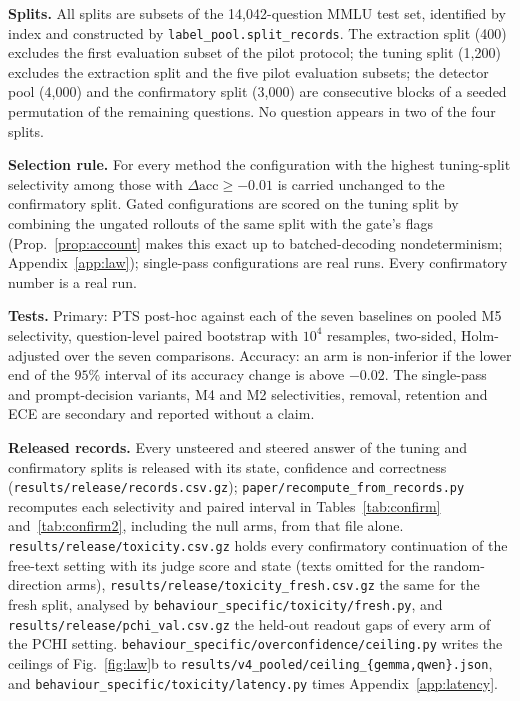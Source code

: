 \documentclass{article}
\begin{document}
\textbf{Splits.} All splits are subsets of the 14{,}042-question MMLU test set,
identified by index and constructed by \texttt{label\_pool.split\_records}. The
extraction split (400) excludes the first evaluation subset of the pilot
protocol; the tuning split (1{,}200) excludes the
extraction split and the five pilot evaluation subsets; the detector pool (4{,}000) and the confirmatory
split (3{,}000) are consecutive blocks of a seeded permutation of the
remaining questions. No question appears in two of the four splits.

\textbf{Selection rule.} For every method the configuration with the highest
tuning-split selectivity among those with $\Delta\mathrm{acc}\ge-0.01$ is
carried unchanged to the confirmatory split. Gated configurations are scored on
the tuning split by combining the ungated rollouts of the same split with the
gate's flags (Prop.~\ref{prop:account} makes this exact up to batched-decoding
nondeterminism; Appendix~\ref{app:law}); single-pass configurations are real
runs. Every confirmatory number is a real run.

\textbf{Tests.} Primary: PTS post-hoc against each of the seven baselines on
pooled M5 selectivity, question-level paired bootstrap with $10^4$ resamples,
two-sided, Holm-adjusted over the seven comparisons. Accuracy: an arm is
non-inferior if the lower end of the $95\%$ interval of its accuracy change is
above $-0.02$. The single-pass and prompt-decision variants, M4 and M2
selectivities, removal, retention and ECE are secondary and reported without
a claim.

\textbf{Released records.} Every unsteered and steered answer of the tuning and
confirmatory splits is released with its state, confidence and correctness
(\texttt{results/release/records.csv.gz}); \texttt{paper/recompute\_from\_records.py}
recomputes each selectivity and paired interval in Tables~\ref{tab:confirm}
and~\ref{tab:confirm2}, including the null arms, from that file alone.
\texttt{results/release/toxicity.csv.gz} holds every confirmatory continuation
of the free-text setting with its judge score and state (texts omitted for the
random-direction arms), \texttt{results/release/toxicity\_fresh.csv.gz} the
same for the fresh split, analysed by \texttt{behaviour\_specific/toxicity/fresh.py},
and \texttt{results/release/pchi\_val.csv.gz} the held-out readout gaps of every
arm of the PCHI setting. \texttt{behaviour\_specific/overconfidence/ceiling.py}
writes the ceilings of Fig.~\ref{fig:law}b to
\texttt{results/v4\_pooled/ceiling\_\{gemma,qwen\}.json}, and
\texttt{behaviour\_specific/toxicity/latency.py} times Appendix~\ref{app:latency}.
\end{document}

